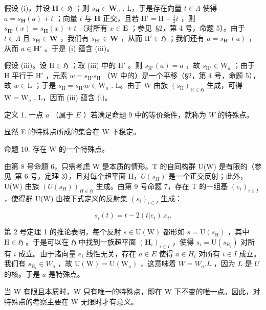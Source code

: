 假设 (i)，并设 \(\mathbf{H} \in \mathfrak{H}\) ；则 \(s_{\mathbf{H}} \in \mathbf{W}_a\) . L，于是存在向量 \(t \in \Lambda\) 使得 \(a = s_{\mathbf{H}}(a) + t\) ；向量 \(t\) 与 \(\mathbf{H}\) 正交，且若 \(\mathrm{H}' = \mathrm{H} + \frac{1}{2} t\) ，则 \(s_{\mathbf{H}'}(x) = s_{\mathbf{H}}(x) + t\) （对所有 \(x \in \mathbf{E}\) ；参见~§2，第 4 号，命题 5）。由于 \(t \in \Lambda\) 且 \(s_{\mathbf{H}} \in \mathbf{W}\) ，我们有 \(s_{\mathbf{H}'} \in \mathbf{W}\) ，从而 \(\mathrm{H}' \in \mathfrak{H}\) ；我们还有 \(a = s_{\mathbf{H}'}(a)\) ，从而 \(a \in \mathbf{H}'\) 。于是 (i) 蕴含 (iii)。

假设 (iii)。设 \(\mathrm{H} \in \mathfrak{H}\) ；取 (iii) 中的 \(\mathrm{H}'\) 。则 \(s_{\mathrm{H}'}(a) = a\) ，故 \(s_{\mathrm{H}'} \in \mathrm{W}_a\) ；由于 \(\mathrm{H}\) 平行于 \(\mathrm{H}'\) ，元素 \(w = s_{\mathrm{H}'} s_{\mathrm{H}}\) （\(\mathrm{W}\) 中的）是一个平移（§2，第 4 号，命题 5），故 \(w \in \mathrm{L}\) ；于是 \(s_{\mathrm{H}} = s_{\mathrm{H}'} w \in \mathrm{W}_a\) . L。由于 \(\mathrm{W}\) 由族 \((s_{\mathrm{H}})_{\mathrm{H} \in \mathfrak{H}}\) 生成，可得 \(\mathrm{W} = \mathrm{W}_a\) . L，因而 (iii) 蕴含 (i)。

定义 1. 一点 \(a\) （属于 \(E\) ）若满足命题 9 中的等价条件，就称为 \(W\) 的特殊点。

显然 E 的特殊点所成的集合在 W 下稳定。

命题 10. 存在 W 的一个特殊点。

由第 8 号命题 6，只需考虑 W 是本质的情形。T 的自同构群 U(W) 是有限的（参见~第 6 号，定理 3），且对每个超平面 H，\(U(s_{H})\) 是一个正交反射；此外，U(W) 由族 \((U(s_{H}))_{H \in \mathfrak{H}}\) 生成。由第 9 号命题 7，存在 T 的一组基 \((e_{i})_{i \in I}\) ，使得群 U(W) 由按下式定义的反射集 \((s_{i})_{i \in I}\) 生成：

\[
s _ {i} (t) = t - 2 (t | e _ {i}). e _ {i}.
\]

第 2 号定理 1 的推论表明，每个反射 \(s \in \mathrm{U}(\mathrm{W})\) 都形如 \(s = \mathrm{U}(s_{\mathrm{H}})\) ，其中 \(\mathrm{H} \in \mathfrak{H}\) 。于是可以在 \(\mathfrak{H}\) 中找到一族超平面 \((\mathbf{H}_i)_{i \in I}\) ，使得 \(s_i = \mathrm{U}(s_{\mathrm{H}_i})\) 对所有 \(i\) 成立。由于诸向量 \(e_i\) 线性无关，存在 \(a \in E\) 使得 \(a \in H_i\) 对所有 \(i \in I\) 成立。我们有 \(s_{\mathrm{H}_i} \in W_a\) ，故 \(\mathrm{U}(\mathrm{W}) = \mathrm{U}(\mathrm{W}_a)\) ，这意味着 \(W = W_a.L\) ，因为 \(L\) 是 \(U\) 的核。于是 \(a\) 是特殊点。

当 W 有限且本质时，W 只有唯一的特殊点，即在 W 下不变的唯一点。因此，对特殊点的考察主要在 W 无限时才有意义。


